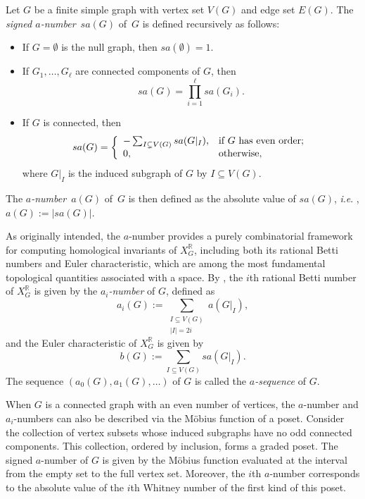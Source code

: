 \documentclass[10pt]{amsart}
\theoremstyle{plain}
\numberwithin{equation}{section}
\theoremstyle{definition}
\newcommand{\R}{\mathbb{R}}
\newcommand{\ie}{\textit{i}.\textit{e}. }
\begin{document}
Let $G$ be a finite simple graph with vertex set $V(G)$ and edge set $E(G)$.
The \emph{signed $a$-number}~$sa(G)$ of~$G$ is defined recursively as follows:
\begin{itemize}
    \item If $G=\emptyset$ is the null graph, then $sa(\emptyset) = 1$.
    \item If $G_1,\ldots, G_\ell$ are connected components of $G$, then 
    $$
        sa(G)=\prod_{i=1}^\ell sa(G_i).
    $$  
    \item If $G$ is connected, then
\begin{equation} \label{rec}
    sa(G) = \left\{
              \begin{array}{ll} 
                -\sum_{I\subsetneq V(G)}sa(G\vert_I), & \hbox{if $G$ has even order;} \\
                0, & \hbox{otherwise,}
              \end{array}
            \right.
\end{equation}
where $G\vert_I$ is the induced subgraph of $G$ by $I \subseteq V(G)$.
\end{itemize}
The \emph{$a$-number}~$a(G)$ of~$G$ is then defined as the absolute value of $sa(G)$, \ie, $a(G) := | sa(G) |$.

As originally intended, the $a$-number provides a purely combinatorial framework for computing homological invariants of $X^\R_G$, including both its rational Betti numbers and Euler characteristic, which are among the most fundamental topological quantities associated with a space.
By \cite{Choi-Park2015}, the $i$th rational Betti number of $X^\R_G$ is given by the \emph{$a_i$-number} of $G$, defined as
$$
    a_i(G):=\sum_{\substack{I\subseteq V(G)\\ |I| =2i}}a(G\vert_I),
$$
and the Euler characteristic of $X^\R_G$ is given by
$$
    b(G):=\sum_{I\subseteq V(G)}sa(G\vert_I).
$$
The sequence $(a_0(G), a_1(G), \ldots )$ of $G$ is called the \emph{$a$-sequence} of $G$.

When $G$ is a connected graph with an even number of vertices, the $a$-number and $a_i$-numbers can also be described via the M\"{o}bius function of a poset.
Consider the collection of vertex subsets whose induced subgraphs have no odd connected components. This collection, ordered by inclusion, forms a graded poset.
The signed $a$-number of $G$ is given by the M\"{o}bius function evaluated at the interval from the empty set to the full vertex set.
Moreover, the $i$th $a$-number corresponds to the absolute value of the $i$th Whitney number of the first kind of this poset.
\end{document}
